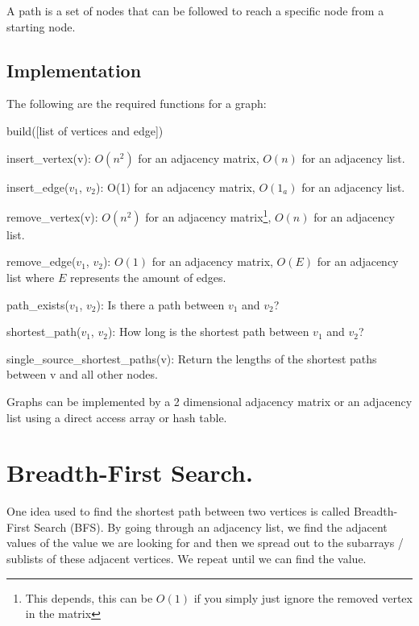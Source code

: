 \documentclass[11pt,a4paper,english]{article}
\begin{document}
A path is a set of nodes that can be followed to reach a specific node from a starting node.

\subsection{Implementation}

The following are the required functions for a graph:

\begin{itemize} {

    \item build([list of vertices and edge])
    \item insert\_vertex(v): $O(n^2)$ for an adjacency matrix, $O(n)$ for an adjacency list.
    \item insert\_edge($v_1$, $v_2$): O(1) for an adjacency matrix, $O(1_a)$ for an adjacency list.
    \item remove\_vertex(v): $O(n^2)$ for an adjacency matrix\footnote{This depends, this can be $O(1)$ if you simply just ignore the removed vertex in the matrix}, $O(n)$ for an adjacency list.
    \item remove\_edge($v_1$, $v_2$): $O(1)$ for an adjacency matrix, $O(E)$ for an adjacency list where $E$ represents the amount of edges.
    \item path\_exists($v_1$, $v_2$): Is there a path between $v_1$ and $v_2$?
    \item shortest\_path($v_1$, $v_2$): How long is the shortest path between $v_1$ and $v_2$?
    \item single\_source\_shortest\_paths(v): Return the lengths of the shortest paths between v and all other nodes.

}
\end{itemize}

\bigskip
\noindent
Graphs can be implemented by a 2 dimensional adjacency matrix or an adjacency list using a direct access array or hash table.

\section{Breadth-First Search.}

One idea used to find the shortest path between two vertices is called Breadth-First Search (BFS). By going through an adjacency list, we find the adjacent values of the value we are looking for and then we spread out to the subarrays / sublists of these adjacent vertices. We repeat until we can find the value.
\end{document}
